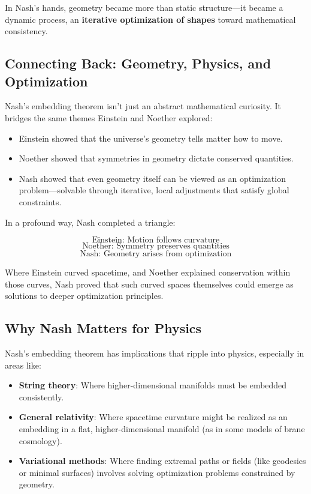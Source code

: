 In Nash’s hands, geometry became more than static structure—it became a dynamic process, an \textbf{iterative optimization of shapes} toward mathematical consistency.

\subsection{Connecting Back: Geometry, Physics, and Optimization}

Nash’s embedding theorem isn’t just an abstract mathematical curiosity. It bridges the same themes Einstein and Noether explored:

\begin{itemize}
  \item Einstein showed that the universe’s geometry tells matter how to move.
  \item Noether showed that symmetries in geometry dictate conserved quantities.
  \item Nash showed that even geometry itself can be viewed as an optimization problem—solvable through iterative, local adjustments that satisfy global constraints.
\end{itemize}

In a profound way, Nash completed a triangle:

\begin{tcolorbox}[colback=blue!5!white, colframe=blue!50!black, title={The Triad of Geometry}]
\[
\text{Einstein: } \text{Motion follows curvature}
\]
\[
\text{Noether: } \text{Symmetry preserves quantities}
\]
\[
\text{Nash: } \text{Geometry arises from optimization}
\]
\end{tcolorbox}

Where Einstein curved spacetime, and Noether explained conservation within those curves, Nash proved that such curved spaces themselves could emerge as solutions to deeper optimization principles.

\subsection{Why Nash Matters for Physics}

Nash’s embedding theorem has implications that ripple into physics, especially in areas like:

\begin{itemize}
  \item \textbf{String theory}: Where higher-dimensional manifolds must be embedded consistently.
  \item \textbf{General relativity}: Where spacetime curvature might be realized as an embedding in a flat, higher-dimensional manifold (as in some models of brane cosmology).
  \item \textbf{Variational methods}: Where finding extremal paths or fields (like geodesics or minimal surfaces) involves solving optimization problems constrained by geometry.
\end{itemize}

